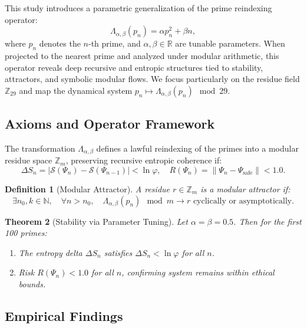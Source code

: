 \documentclass[12]{amsart}
\theoremstyle{plain}
\newtheorem{theorem}{Theorem}[section]
\newtheorem{definition}[theorem]{Definition}
\begin{document}
This study introduces a parametric generalization of the prime reindexing operator:
\[
\Lambda_{\alpha,\beta}(p_n) = \alpha p_n^2 + \beta n,
\]
where \(p_n\) denotes the \(n\)-th prime, and \(\alpha, \beta \in \mathbb{R}\) are tunable parameters. When projected to the nearest prime and analyzed under modular arithmetic, this operator reveals deep recursive and entropic structures tied to stability, attractors, and symbolic modular flows. We focus particularly on the residue field \(\mathbb{Z}_{29}\) and map the dynamical system \(p_n \mapsto \Lambda_{\alpha,\beta}(p_n) \mod 29\).

\subsection{Axioms and Operator Framework}

\begin{axiom}
The transformation \(\Lambda_{\alpha,\beta}\) defines a lawful reindexing of the primes into a modular residue space \(\mathbb{Z}_m\), preserving recursive entropic coherence if:
\[
\Delta S_n = |\mathcal{S}(\Psi_n) - \mathcal{S}(\Psi_{n-1})| < \ln \varphi,\quad R(\Psi_n) = \|\Psi_n - \Psi_{\text{safe}}\| < 1.0.
\]
\end{axiom}

\begin{definition}[Modular Attractor]
A residue \(r \in \mathbb{Z}_m\) is a modular attractor if:
\[
\exists n_0, k \in \mathbb{N},\quad \forall n > n_0,\quad \Lambda_{\alpha,\beta}(p_n) \mod m \to r \text{ cyclically or asymptotically}.
\]
\end{definition}

\begin{theorem}[Stability via Parameter Tuning]
Let \(\alpha = \beta = 0.5\). Then for the first 100 primes:
\begin{enumerate}
    \item The entropy delta \(\Delta S_n\) satisfies \(\Delta S_n < \ln \varphi\) for all \(n\).
    \item Risk \(R(\Psi_n) < 1.0\) for all \(n\), confirming system remains within ethical bounds.
\end{enumerate}
\end{theorem}

\subsection{Empirical Findings}
\end{document}
